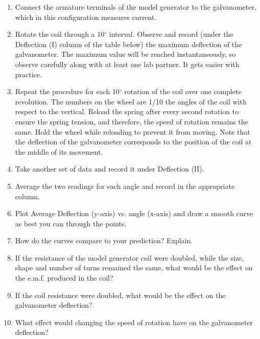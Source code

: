 \begin{enumerate}
\item Connect the armature terminals of the model generator to the galvanometer,
which in this configuration measures current.
\item Rotate the coil through a 10$^\circ$ interval. Observe and record
(under the Deflection (I) column of the table below) the maximum deflection
of the galvanometer. The maximum value will be reached instantaneously,
so observe carefully along with at least one lab partner. It gets
easier with practice.
\item Repeat the procedure for each 10$^\circ$ rotation of the coil over
one complete revolution. The numbers on the wheel are 1/10 the angles
of the coil with respect to the vertical. Reload the spring after
every second rotation to ensure the spring tension, and therefore,
the speed of rotation remains the same. Hold the wheel while reloading
to prevent it from moving. Note that the deflection of the galvanometer
corresponds to the position of the coil at the middle of its movement.
\item Take another set of data and record it under Deflection (II).
\item Average the two readings for each angle and record in the appropriate
column.
\item Plot Average Deflection (y-axis) vs. angle (x-axis) and draw a smooth
curve as best you can through the points.
\item How do the curves compare to your prediction? Explain.\vspace{15mm}

\item If the resistance of the model generator coil were doubled, while
the size, shape and number of turns remained the same, what would
be the effect on the e.m.f. produced in the coil?\vspace{15mm}

\item If the coil resistance were doubled, what would be the effect on the
galvanometer deflection?\vspace{15mm}

\item What effect would changing the speed of rotation have on the galvanometer
deflection?\vspace{15mm}

\end{enumerate}
